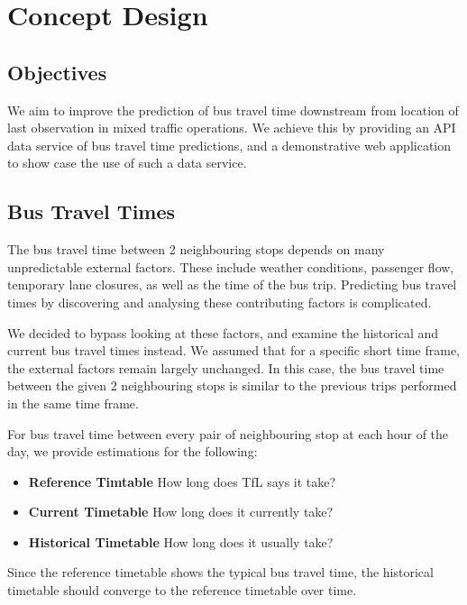 \chapter{Concept Design}
\label{ch:concept_design}
\section{Objectives}
\par We aim to improve the prediction of bus travel time downstream from location of last observation in mixed traffic operations. We achieve this by providing an API data service of bus travel time predictions, and a demonstrative web application to show case the use of such a data service.

\section{Bus Travel Times}
\par The bus travel time between 2 neighbouring stops depends on many unpredictable external factors. These include weather conditions, passenger flow, temporary lane closures, as well as the time of the bus trip. Predicting bus travel times by discovering and analysing these contributing factors is complicated.

\par We decided to bypass looking at these factors, and examine the historical and current bus travel times instead. We assumed that for a specific short time frame, the external factors remain largely unchanged. In this case, the bus travel time between the given 2 neighbouring stops is similar to the previous trips performed in the same time frame.

\par For bus travel time between every pair of neighbouring stop at each hour of the day, we provide estimations for the following:
\begin{itemize}
  \item \textbf{Reference Timtable} How long does TfL says it take?
  \item \textbf{Current Timetable} How long does it currently take?
  \item \textbf{Historical Timetable} How long does it usually take?
\end{itemize}

\par Since the reference timetable shows the typical bus travel time, the historical timetable should converge to the reference timetable over time.

